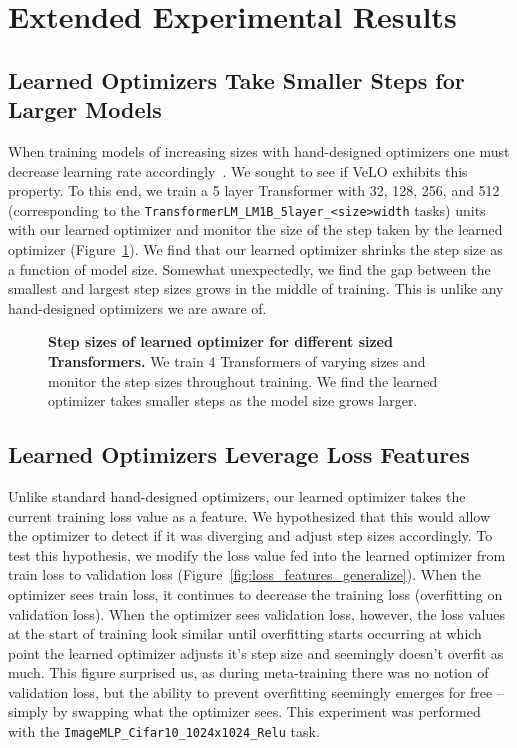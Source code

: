 \documentclass[11pt]{article}
\begin{document}
\section{Extended Experimental Results}
\label{sec:ext_exp_res}

\subsection{Learned Optimizers Take Smaller Steps for Larger Models}
When training models of increasing sizes with hand-designed optimizers one must decrease learning rate accordingly~\citep{krizhevsky2014one, goyal2017accurate}.
We sought to see if VeLO exhibits this property.
To this end, we train a 5 layer Transformer with 32, 128, 256, and 512 (corresponding to the \texttt{TransformerLM\_LM1B\_5layer\_<size>width} tasks) units with our learned optimizer and monitor the size of the step taken by the learned optimizer (Figure~\ref{app:fig:diff_model_size}).
We find that our learned optimizer shrinks the step size as a function of model size.
Somewhat unexpectedly, we find the gap between the smallest and largest step sizes grows in the middle of training.
This is unlike any hand-designed optimizers we are aware of.

\begin{figure}
    \centering
    \caption{\textbf{Step sizes of learned optimizer for different sized Transformers.} We train 4 Transformers of varying sizes and monitor the step sizes throughout training. We find the learned optimizer takes smaller steps as the model size grows larger.
    \label{app:fig:diff_model_size}
    }
\end{figure}


\subsection{Learned Optimizers Leverage Loss Features}
Unlike standard hand-designed optimizers, our learned optimizer takes the current training loss value as a feature.
We hypothesized that this would allow the optimizer to detect if it was diverging and adjust step sizes accordingly.
To test this hypothesis, we modify the loss value fed into the learned optimizer from train loss to validation loss (Figure~\ref{fig:loss_features_generalize}).
When the optimizer sees train loss, it continues to decrease the training loss (overfitting on validation loss).
When the optimizer sees validation loss, however, the loss values at the start of training look similar until overfitting starts occurring at which point the learned optimizer adjusts it's step size and seemingly doesn't overfit as much.
This figure surprised us, as during meta-training there was no notion of validation loss, but the ability to prevent overfitting seemingly emerges for free -- simply by swapping what the optimizer sees.
This experiment was performed with the \texttt{ImageMLP\_Cifar10\_1024x1024\_Relu} task.
\end{document}
